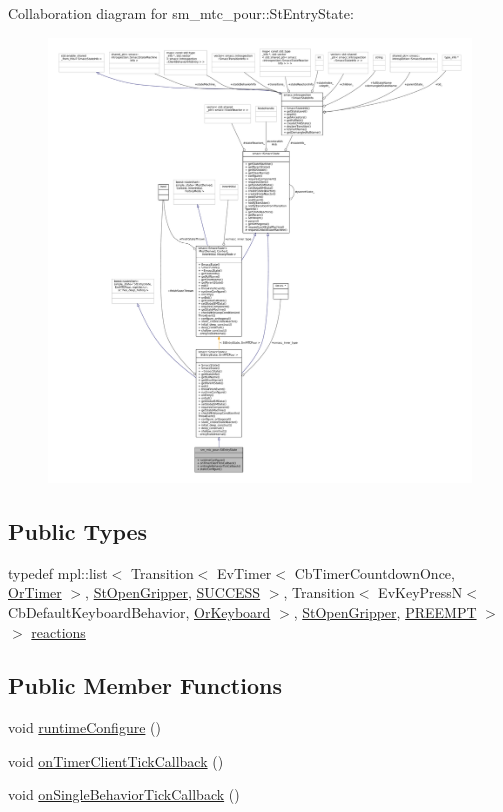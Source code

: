 Collaboration diagram for sm\+\_\+mtc\+\_\+pour\+:\+:St\+Entry\+State\+:
\nopagebreak
\begin{figure}[H]
\begin{center}
\leavevmode
\includegraphics[width=350pt]{structsm__mtc__pour_1_1StEntryState__coll__graph}
\end{center}
\end{figure}
\subsection*{Public Types}
\begin{DoxyCompactItemize}
\item 
typedef mpl\+::list$<$ Transition$<$ Ev\+Timer$<$ Cb\+Timer\+Countdown\+Once, \hyperlink{classsm__mtc__pour_1_1OrTimer}{Or\+Timer} $>$, \hyperlink{structsm__mtc__pour_1_1StOpenGripper}{St\+Open\+Gripper}, \hyperlink{classSUCCESS}{S\+U\+C\+C\+E\+SS} $>$, Transition$<$ Ev\+Key\+PressN$<$ Cb\+Default\+Keyboard\+Behavior, \hyperlink{classsm__mtc__pour_1_1OrKeyboard}{Or\+Keyboard} $>$, \hyperlink{structsm__mtc__pour_1_1StOpenGripper}{St\+Open\+Gripper}, \hyperlink{classPREEMPT}{P\+R\+E\+E\+M\+PT} $>$ $>$ \hyperlink{structsm__mtc__pour_1_1StEntryState_a8d996cedd27e47dbade59f1102d7bdb3}{reactions}
\end{DoxyCompactItemize}
\subsection*{Public Member Functions}
\begin{DoxyCompactItemize}
\item 
void \hyperlink{structsm__mtc__pour_1_1StEntryState_ac8189de75335178a2264960e843bda6b}{runtime\+Configure} ()
\item 
void \hyperlink{structsm__mtc__pour_1_1StEntryState_a2691ccc4ef7309993755984e12931996}{on\+Timer\+Client\+Tick\+Callback} ()
\item 
void \hyperlink{structsm__mtc__pour_1_1StEntryState_abb623ad27ec9de6a9b2082d1d6d253e5}{on\+Single\+Behavior\+Tick\+Callback} ()
\end{DoxyCompactItemize}
